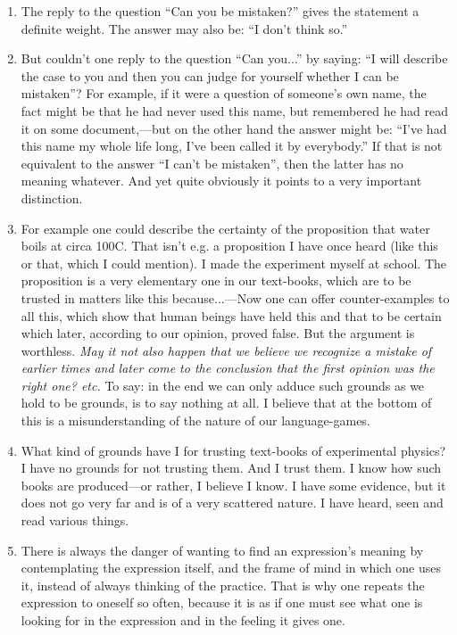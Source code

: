 \documentclass{book}
\begin{document}
\begin{enumerate}
\item
The reply to the question ``Can you be mistaken?'' gives the statement a
definite weight. The answer may also be: ``I don't think so.''

\item
But couldn't one reply to the question ``Can you...'' by saying: ``I will
describe the case to you and then you can judge for yourself whether I can be
mistaken''?  For example, if it were a question of someone's own name, the fact
might be that he had never used this name, but remembered he had read it on
some document,---but on the other hand the answer might be: ``I've had this
name my whole life long, I've been called it by everybody.'' If that is not
equivalent to the answer ``I can't be mistaken'', then the latter has no
meaning whatever. And yet quite obviously it points to a very important
distinction.

\item
For example one could describe the certainty of the proposition that water
boils at circa 100C. That isn't e.g. a proposition I have once heard (like this
or that, which I could mention). I made the experiment myself at school. The
proposition is a very elementary one in our text-books, which are to be trusted
in matters like this because...---Now one can offer counter-examples to all
this, which show that human beings have held this and that to be certain which
later, according to our opinion, proved false. But the argument is worthless.
\emph{May it not also happen that we believe we recognize a mistake of earlier
times and later come to the conclusion that the first opinion was the right
one? etc.} To say: in the end we can only adduce such grounds as we hold to be
grounds, is to say nothing at all.  I believe that at the bottom of this is a
misunderstanding of the nature of our language-games.

\item
What kind of grounds have I for trusting text-books of experimental physics?  I
have no grounds for not trusting them. And I trust them. I know how such books
are produced---or rather, I believe I know. I have some evidence, but it does
not go very far and is of a very scattered nature. I have heard, seen and read
various things.

\item
There is always the danger of wanting to find an expression's meaning by
contemplating the expression itself, and the frame of mind in which one uses
it, instead of always thinking of the practice. That is why one repeats the
expression to oneself so often, because it is as if one must see what one is
looking for in the expression and in the feeling it gives one.


\end{enumerate}
\end{document}
